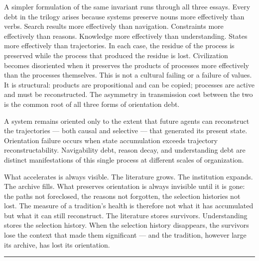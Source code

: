 A simpler formulation of the same invariant runs through all three essays.
Every debt in the trilogy arises because systems preserve nouns more effectively
than verbs. Search results more effectively than navigation. Constraints more
effectively than reasons. Knowledge more effectively than understanding. States
more effectively than trajectories. In each case, the residue of the process
is preserved while the process that produced the residue is lost. Civilization
becomes disoriented when it preserves the products of processes more effectively
than the processes themselves. This is not a cultural failing or a failure of
values. It is structural: products are propositional and can be copied; processes
are active and must be reconstructed. The asymmetry in transmission cost
between the two is the common root of all three forms of orientation debt.

\begin{principle}
A system remains oriented only to the extent that future agents can reconstruct
the trajectories --- both causal and selective --- that generated its present
state. Orientation failure occurs when state accumulation exceeds trajectory
reconstructability. Navigability debt, reason decay, and understanding debt
are distinct manifestations of this single process at different scales of
organization.
\end{principle}

What accelerates is always visible. The literature grows. The institution
expands. The archive fills. What preserves orientation is always invisible
until it is gone: the paths not foreclosed, the reasons not forgotten, the
selection histories not lost. The measure of a tradition's health is therefore
not what it has accumulated but what it can still reconstruct. The literature
stores survivors. Understanding stores the selection history. When the
selection history disappears, the survivors lose the context that made them
significant --- and the tradition, however large its archive, has lost its
orientation.

\bigskip
\begin{center}
  \rule{0.4\textwidth}{0.4pt}
\end{center}

